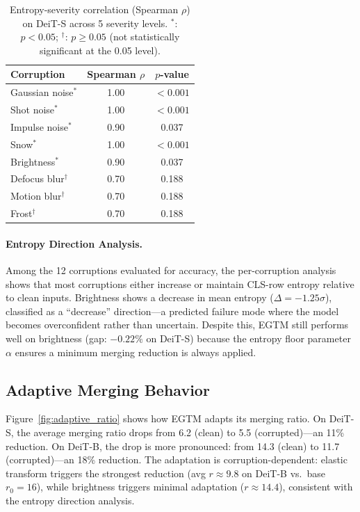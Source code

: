 \documentclass{article}
\newcommand{\ours}{EGTM}
\begin{document}
\begin{table}[t]
\caption{Entropy-severity correlation (Spearman $\rho$) on DeiT-S across 5 severity levels. $^*$: $p < 0.05$; $^\dagger$: $p \geq 0.05$ (not statistically significant at the 0.05 level).}
\label{tab:entropy_corr}
\centering
\small
\begin{tabular}{lcc}
\toprule
Corruption & Spearman $\rho$ & $p$-value \\
\midrule
Gaussian noise$^*$   & 1.00 & $< 0.001$ \\
Shot noise$^*$       & 1.00 & $< 0.001$ \\
Impulse noise$^*$    & 0.90 & 0.037 \\
Snow$^*$             & 1.00 & $< 0.001$ \\
Brightness$^*$       & 0.90 & 0.037 \\
Defocus blur$^\dagger$ & 0.70 & 0.188 \\
Motion blur$^\dagger$  & 0.70 & 0.188 \\
Frost$^\dagger$        & 0.70 & 0.188 \\
\bottomrule
\end{tabular}
\end{table}

\paragraph{Entropy Direction Analysis.}
Among the 12 corruptions evaluated for accuracy, the per-corruption analysis shows that most corruptions either increase or maintain CLS-row entropy relative to clean inputs. Brightness shows a decrease in mean entropy ($\Delta = -1.25\sigma$), classified as a ``decrease'' direction---a predicted failure mode where the model becomes overconfident rather than uncertain. Despite this, \ours{} still performs well on brightness (gap: $-0.22\%$ on DeiT-S) because the entropy floor parameter $\alpha$ ensures a minimum merging reduction is always applied.

\subsection{Adaptive Merging Behavior}

Figure~\ref{fig:adaptive_ratio} shows how \ours{} adapts its merging ratio. On DeiT-S, the average merging ratio drops from 6.2 (clean) to 5.5 (corrupted)---an 11\% reduction. On DeiT-B, the drop is more pronounced: from 14.3 (clean) to 11.7 (corrupted)---an 18\% reduction. The adaptation is corruption-dependent: elastic transform triggers the strongest reduction (avg $r \approx 9.8$ on DeiT-B vs.\ base $r_0{=}16$), while brightness triggers minimal adaptation ($r \approx 14.4$), consistent with the entropy direction analysis.
\end{document}
